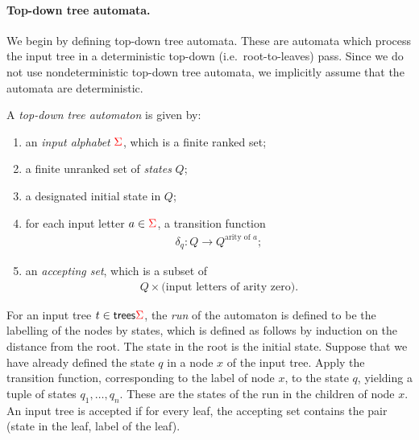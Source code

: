\paragraph*{Top-down tree automata.}
We begin by defining top-down tree automata. 
These are automata which process the input tree in a deterministic top-down (i.e.~root-to-leaves)  pass. Since we do not use nondeterministic top-down tree automata, we implicitly assume that the automata are deterministic.


\begin{definition}
    A \emph{top-down tree automaton}  is given by:
    \begin{enumerate}
        \item an \emph{input alphabet} ${\color{red}{\Sigma}}$, which is a finite ranked set;
        \item a  finite unranked set of \emph{states} $Q$;
        \item a designated initial state in $Q$;
        \item \label{it:top-down-transition} for each input letter $a \in {\color{red}{\Sigma}}$, a transition function
        \begin{align*}
        \delta_q : Q \to Q^{\text{arity of $a$}};
        \end{align*}
        \item an \emph{accepting set}, which is a subset of 
        \begin{align*}
        Q \times \text{(input letters of arity zero)}.
        \end{align*}
    \end{enumerate}
\end{definition}
For an input tree $t \in \mathsf {trees} {\color{red}{\Sigma}}$, the \emph{run} of the automaton is defined to be the labelling of the nodes by states, which is  defined as follows by induction on the distance from the root. The state in the root is the initial state. Suppose that we have already defined the state $q$ in a node $x$ of the input tree. Apply the transition function, corresponding to the label of node $x$, to the state $q$, yielding a tuple of states $q_1,\ldots,q_n$. These are the states of the run in the children of node $x$. An input tree is accepted if for every leaf, the accepting set contains the pair (state in the leaf, label of the leaf). 




